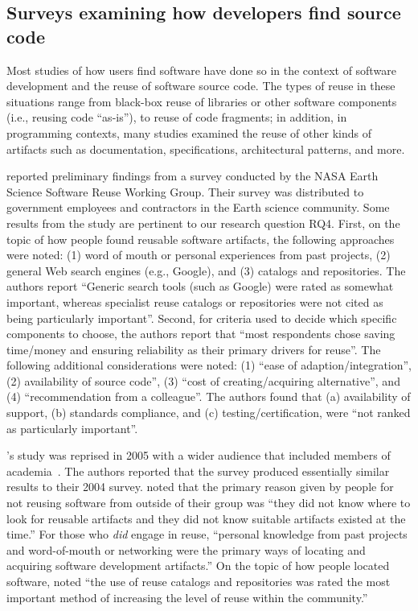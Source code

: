 \documentclass[review]{elsarticle}
\begin{document}
\subsection{Surveys examining how developers find source code}
\label{code-search-by-developers}

Most studies of how users find software have done so in the context of software development and the reuse of software source code.  The types of reuse in these situations range from black-box reuse of libraries or other software components (i.e., reusing code ``as-is''), to reuse of code fragments; in addition, in programming contexts, many studies examined the reuse of other kinds of artifacts such as documentation, specifications, architectural patterns, and more.

\citet{samadi_2004} reported preliminary findings from a survey conducted by the NASA Earth Science Software Reuse Working Group. Their survey was distributed to government employees and contractors in the Earth science community.  Some results from the study are pertinent to our research question RQ4.  First, on the topic of how people found reusable software artifacts, the following approaches were noted: (1) word of mouth or personal experiences from past projects, (2) general Web search engines (e.g., Google), and (3) catalogs and repositories.  The authors report ``Generic search tools (such as Google) were rated as somewhat important, whereas specialist reuse catalogs or repositories were not cited as being particularly important''.  Second, for criteria used to decide which specific components to choose, the authors report that ``most respondents chose saving time/money and ensuring reliability as their primary drivers for reuse''.  The following additional considerations were noted: (1) ``ease of adaption/integration'', (2) availability of source code'', (3) ``cost of creating/acquiring alternative'', and (4) ``recommendation from a colleague''.  The authors found that (a) availability of support, (b) standards compliance, and (c) testing/certification, were ``not ranked as particularly important''.

\citeauthor{samadi_2004}'s study was reprised in 2005 with a wider audience that included members of academia~\citep{marshall2006software}. The authors reported that the survey produced essentially similar results to their 2004 survey. \citeauthor{marshall2006software} noted that the primary reason given by people for not reusing software from outside of their group was ``they did not know where to look for reusable artifacts and they did not know suitable artifacts existed at the time.'' For those who \emph{did} engage in reuse, ``personal knowledge from past projects and word-of-mouth or networking were the primary ways of locating and acquiring software development artifacts.'' On the topic of how people located software, \citeauthor{marshall2006software} noted ``the use of reuse catalogs and repositories was rated the most important method of increasing the level of reuse within the community.''
\end{document}
